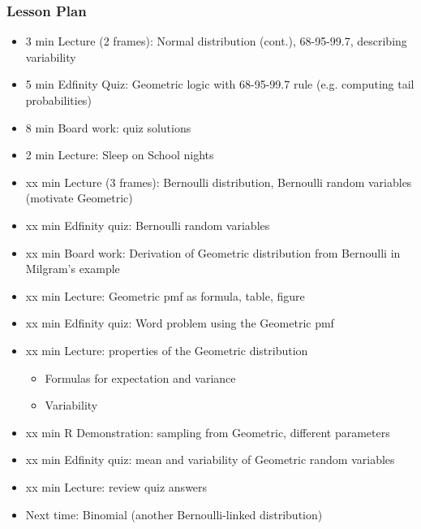 \begin{frame}
    \frametitle{Lesson Plan}
    \begin{itemize}
        \item 3 min Lecture (2 frames): Normal distribution (cont.), 68-95-99.7, describing variability
        \item 5 min Edfinity Quiz: Geometric logic with 68-95-99.7 rule (e.g. computing tail probabilities)
        \item 8 min Board work: quiz solutions
        \item 2 min Lecture: Sleep on School nights

        \item xx min Lecture (3 frames): Bernoulli distribution, Bernoulli random variables (motivate Geometric)
        \item xx min Edfinity quiz: Bernoulli random variables
        \item xx min Board work: Derivation of Geometric distribution from Bernoulli in Milgram's example
        \item xx min Lecture: Geometric pmf as formula, table, figure
        \item xx min Edfinity quiz: Word problem using the Geometric pmf
        \item xx min Lecture: properties of the Geometric distribution
        \begin{itemize}
            \item Formulas for expectation and variance
            \item Variability
        \end{itemize}
        \item xx min R Demonstration: sampling from Geometric, different parameters
        \item xx min Edfinity quiz: mean and variability of Geometric random variables
        \item xx min Lecture: review quiz answers
        \item Next time: Binomial (another Bernoulli-linked distribution)
    \end{itemize}
\end{frame}



